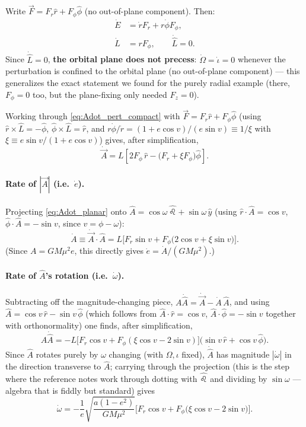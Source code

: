 \documentclass[11pt]{article}
\newcommand{\vecA}{\vec A}
\newcommand{\vecF}{\vec F}
\newcommand{\hatn}{\hat \leo}
\newcommand{\rhat}{\hat r}
\newcommand{\phihat}{\hat\phi}
\begin{document}
Write $\vecF=F_r\rhat+F_\phi\phihat$ (no out-of-plane component). Then:
\begin{align}
\dot E &= \dot r F_r + r\dot\phi F_\phi, \label{eq:Edot_planar}\\
\dot L &= rF_\phi, \qquad \dot{\hat L}=0. \label{eq:L_planar}
\end{align}
Since $\dot{\hat L}=0$, \textbf{the orbital plane does not precess}: $\dot\Omega=\dot\iota=0$ whenever the perturbation is confined to the orbital plane (no out-of-plane component) — this generalizes the exact statement we found for the purely radial example (there, $F_\phi=0$ too, but the plane-fixing only needed $F_z=0$).

Working through \eqref{eq:Adot_pert_compact} with $\vecF=F_r\rhat+F_\phi\phihat$ (using $\rhat\times\hat L=-\phihat$, $\phihat\times\hat L=\rhat$, and $r\dot\phi/\dot r = (1+e\cos v)/(e\sin v)\equiv 1/\xi$ with $\xi\equiv e\sin v/(1+e\cos v)$) gives, after simplification,
\begin{equation}
\dot{\vecA} = L\left[2F_\phi\,\rhat - \Big(F_r+\xi F_\phi\Big)\phihat\right]. \label{eq:Adot_planar}
\end{equation}

\paragraph{Rate of $|\vecA|$ (i.e.\ $\dot e$).} Projecting \eqref{eq:Adot_planar} onto $\hat A=\cos\omega\,\hatn+\sin\omega\,\hat y$ (using $\rhat\cdot\hat A=\cos v$, $\phihat\cdot\hat A=-\sin v$, since $v=\phi-\omega$):
\begin{equation}
\dot A \equiv \dot{\vecA}\cdot\hat A= L\Big[F_r\sin v + F_\phi\big(2\cos v+\xi\sin v\big)\Big]. \label{eq:Amagdot}
\end{equation}
(Since $A=GM\mu^2e$, this directly gives $\dot e = \dot A/(GM\mu^2)$.)

\paragraph{Rate of $\hat A$'s rotation (i.e.\ $\dot\omega$).} Subtracting off the magnitude-changing piece, $A\dot{\hat A} = \dot{\vecA}-\dot A\,\hat A$, and using $\hat A = \cos v\,\rhat-\sin v\,\phihat$ (which follows from $\hat A\cdot\rhat=\cos v$, $\hat A\cdot\phihat=-\sin v$ together with orthonormality) one finds, after simplification,
\begin{equation}
A\dot{\hat A} = -L\Big[F_r\cos v + F_\phi(\xi\cos v - 2\sin v)\Big]\big(\sin v\,\rhat+\cos v\,\phihat\big). \label{eq:Ahatdot}
\end{equation}
Since $\hat A$ rotates purely by $\omega$ changing (with $\Omega,\iota$ fixed), $\dot{\hat A}$ has magnitude $|\dot\omega|$ in the direction transverse to $\hat A$; carrying through the projection (this is the step where the reference notes work through dotting with $\hatn$ and dividing by $\sin\omega$ — algebra that is fiddly but standard) gives
\begin{equation}
\boxed{\dot\omega = -\frac1e\sqrt{\frac{a(1-e^2)}{GM\mu^2}}\Big[F_r\cos v+F_\phi\big(\xi\cos v - 2\sin v\big)\Big].} \label{eq:omegadot}
\end{equation}
\end{document}
